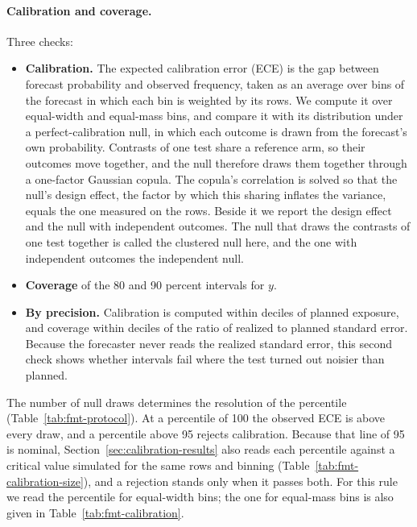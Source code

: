 \documentclass[sigconf,nonacm]{acmart}
\begin{document}
\paragraph{Calibration and coverage.} Three checks:
\begin{itemize}
\item \textbf{Calibration.} The expected calibration error (ECE) is the gap between forecast probability and observed frequency, taken as an average over bins of the forecast in which each bin is weighted by its rows. We compute it over equal-width and equal-mass bins, and compare it with its distribution under a perfect-calibration null, in which each outcome is drawn from the forecast's own probability. Contrasts of one test share a reference arm, so their outcomes move together, and the null therefore draws them together through a one-factor Gaussian copula. The copula's correlation is solved so that the null's design effect, the factor by which this sharing inflates the variance, equals the one measured on the rows. Beside it we report the design effect and the null with independent outcomes. The null that draws the contrasts of one test together is called the clustered null here, and the one with independent outcomes the independent null.
\item \textbf{Coverage} of the 80 and 90 percent intervals for $y$.
\item \textbf{By precision.} Calibration is computed within deciles of planned exposure, and coverage within deciles of the ratio of realized to planned standard error. Because the forecaster never reads the realized standard error, this second check shows whether intervals fail where the test turned out noisier than planned.
\end{itemize}
The number of null draws determines the resolution of the percentile (Table~\ref{tab:fmt-protocol}). At a percentile of 100 the observed ECE is above every draw, and a percentile above 95 rejects calibration. Because that line of 95 is nominal, Section~\ref{sec:calibration-results} also reads each percentile against a critical value simulated for the same rows and binning (Table~\ref{tab:fmt-calibration-size}), and a rejection stands only when it passes both. For this rule we read the percentile for equal-width bins; the one for equal-mass bins is also given in Table~\ref{tab:fmt-calibration}.
\end{document}
